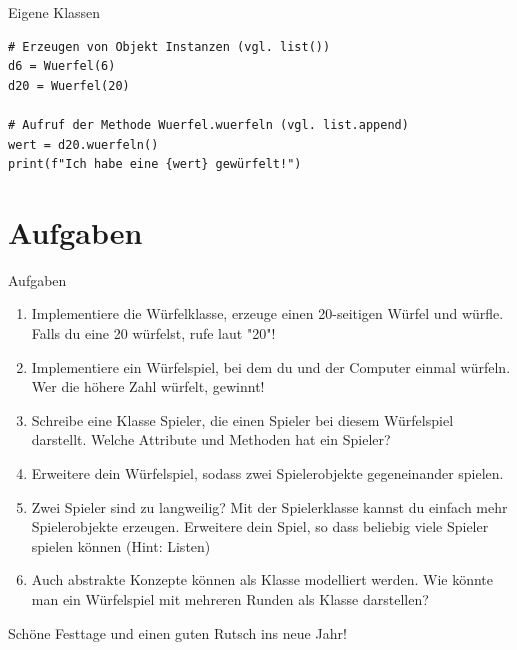 \begin{frame}[fragile]{Eigene Klassen}
\begin{lstlisting}
# Erzeugen von Objekt Instanzen (vgl. list())
d6 = Wuerfel(6)
d20 = Wuerfel(20)

# Aufruf der Methode Wuerfel.wuerfeln (vgl. list.append)
wert = d20.wuerfeln()
print(f"Ich habe eine {wert} gewürfelt!")
\end{lstlisting}
\end{frame}


\section{Aufgaben}
\begin{frame}{Aufgaben}
    \begin{enumerate}
        \item Implementiere die Würfelklasse, erzeuge einen 20-seitigen Würfel und würfle. Falls du eine 20 würfelst, rufe laut "20"!
        \item Implementiere ein Würfelspiel, bei dem du und der Computer einmal würfeln. Wer die höhere Zahl würfelt, gewinnt!
        \item Schreibe eine Klasse \glqq Spieler\grqq, die einen Spieler bei diesem Würfelspiel darstellt. Welche Attribute und Methoden hat ein Spieler?
        \item Erweitere dein Würfelspiel, sodass zwei Spielerobjekte gegeneinander spielen.
        \item Zwei Spieler sind zu langweilig? Mit der Spielerklasse kannst du einfach mehr Spielerobjekte erzeugen. Erweitere dein Spiel, so dass beliebig viele Spieler spielen können (Hint: Listen)
        \item Auch abstrakte Konzepte können als Klasse modelliert werden. Wie könnte man ein Würfelspiel mit mehreren Runden als Klasse darstellen?
    \end{enumerate}
\end{frame}


\begin{frame}[standout]
Schöne Festtage und einen guten Rutsch ins neue Jahr!
\end{frame}

